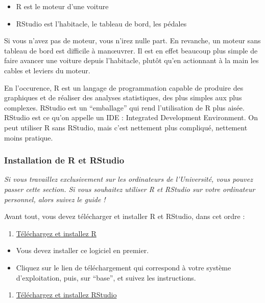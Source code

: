 \documentclass[
  a4paper,
]{article}
\providecommand{\tightlist}{%
  \setlength{\itemsep}{0pt}\setlength{\parskip}{0pt}}
\begin{document}
\begin{itemize}
\tightlist
\item
  R est le moteur d'une voiture
\item
  RStudio est l'habitacle, le tableau de bord, les pédales
\end{itemize}

Si vous n'avez pas de moteur, vous n'irez nulle part. En revanche, un moteur sans tableau de bord est difficile à manœuvrer. Il est en effet beaucoup plus simple de faire avancer une voiture depuis l'habitacle, plutôt qu'en actionnant à la main les cables et leviers du moteur.

En l'occurence, R est un langage de programmation capable de produire des graphiques et de réaliser des analyses statistiques, des plus simples aux plus complexes. RStudio est un ``emballage'' qui rend l'utilisation de R plus aisée. RStudio est ce qu'on appelle un IDE : Integrated Development Environment. On peut utiliser R sans RStudio, mais c'est nettement plus compliqué, nettement moins pratique.

\hypertarget{installation-de-r-et-rstudio}{%
\subsubsection{Installation de R et RStudio}\label{installation-de-r-et-rstudio}}

\emph{Si vous travaillez exclusivement sur les ordinateurs de l'Université, vous pouvez passer cette section. Si vous souhaitez utiliser R et RStudio sur votre ordinateur personnel, alors suivez le guide !}

Avant tout, vous devez télécharger et installer R et RStudio, dans cet ordre :

\begin{enumerate}
\def\labelenumi{\arabic{enumi}.}
\tightlist
\item
  \href{https://cran.r-project.org}{Téléchargez et installez R}
\end{enumerate}

\begin{itemize}
\tightlist
\item
  Vous devez installer ce logiciel en premier.
\item
  Cliquez sur le lien de téléchargement qui correspond à votre système d'exploitation, puis, sur ``base'', et suivez les instructions.
\end{itemize}

\begin{enumerate}
\def\labelenumi{\arabic{enumi}.}
\setcounter{enumi}{1}
\tightlist
\item
  \href{https://www.rstudio.com/products/RStudio/\#Desktop}{Téléchargez et installez RStudio}
\end{enumerate}
\end{document}
